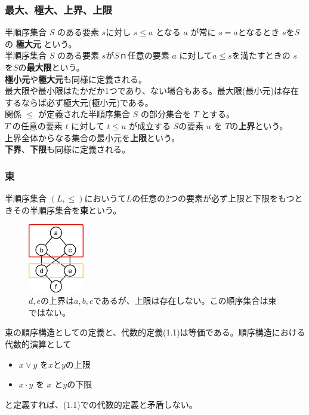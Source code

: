 \documentclass[a4j,10pt,oneside,openany,fleqn]{jsbook}
\begin{document}
\subsubsection{最大、極大、上界、上限}
半順序集合 $S$ のある要素 $s$に対し $s \leq a$ となる $a$ が常に $s=a$となるとき $s$を$S$の \textbf{極大元} という。\\
半順序集合 $S$ のある要素 $s$が$S$ｎ任意の要素 $a$ に対して$a\leq s$を満たすときの $s$ を$S$の\textbf{最大限}という。\\
\textbf{極小元}や\textbf{極大元}も同様に定義される。\\
最大限や最小限はたかだか1つであり、ない場合もある。最大限(最小元)は存在するならば必ず極大元(極小元)である。\\

関係 $\leq$ が定義された半順序集合 $S$ の部分集合を $T$ とする。\\
$T$ の任意の要素 $t$ に対して $t \leq u$ が成立する $S$の要素 $u$ を $T$の\textbf{上界}という。\\
上界全体からなる集合の最小元を\textbf{上限}という。\\
\textbf{下界}、\textbf{下限}も同様に定義される。
\newpage
\subsubsection{束}
半順序集合 $(L, \leq)$においうて$L$の任意の2つの要素が必ず上限と下限をもつときその半順序集合を\textbf{束}という。

\begin{figure}[h]
  \centering\includegraphics[height=3cm]{Images/Hasse_not_lattice.png}
  \caption{$d,e$の上界は${a,b,c}$であるが、上限は存在しない。この順序集合は束ではない。}
\end{figure}

束の順序構造としての定義と、代数的定義(1.1)は等価である。順序構造における代数的演算として
\begin{itemize}
\item $x \vee y$ を$x$と$y$の上限
\item $x \cdot y$ を $x$ と$y$の下限 
\end{itemize}
と定義すれば、(1.1)での代数的定義と矛盾しない。
\end{document}

